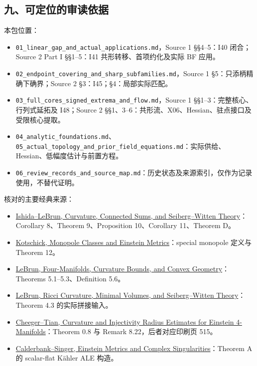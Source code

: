 \documentclass[
  10pt,
]{article}
\providecommand{\tightlist}{%
  \setlength{\itemsep}{0pt}\setlength{\parskip}{0pt}}
\begin{document}
\hypertarget{ux4e5dux53efux5b9aux4f4dux7684ux5ba1ux8bfbux4f9dux636e}{%
\subsection{九、可定位的审读依据}\label{ux4e5dux53efux5b9aux4f4dux7684ux5ba1ux8bfbux4f9dux636e}}

本包位置：

\begin{itemize}
\tightlist
\item
  \nolinkurl{01_linear_gap_and_actual_applications.md}，Source 1
  §§4--5：I40 闭合；Source 2 Part I §§1--5：I41 共形转移、首项约化及实际
  BF 应用。
\item
  \nolinkurl{02_endpoint_covering_and_sharp_subfamilies.md}，Source 1
  §5：只添柄精确下确界；Source 2 §3：I45；§4：局部实际匹配。
\item
  \nolinkurl{03_full_cores_signed_extrema_and_flow.md}，Source 1
  §§1--3：完整核心、行列式延拓及 I48；Source 2
  §§1、3--6：共形流、X06、Hessian、驻点接口及受限核心提取。
\item
  \nolinkurl{04_analytic_foundations.md}、\nolinkurl{05_actual_topology_and_prior_field_equations.md}：实际供给、Hessian、低幅度估计与前置方程。
\item
  \nolinkurl{06_review_records_and_source_map.md}：历史状态及来源索引，仅作为记录使用，不替代证明。
\end{itemize}

核对的主要经典来源：

\begin{itemize}
\tightlist
\item
  \href{https://arxiv.org/pdf/math/0111228}{Ishida--LeBrun, Curvature,
  Connected Sums, and Seiberg--Witten Theory}：Corollary 8、Theorem
  9、Proposition 10、Corollary 11、Theorem D。
\item
  \href{https://arxiv.org/pdf/math/0306022}{Kotschick, Monopole Classes
  and Einstein Metrics}：special monopole 定义与 Theorem 12。
\item
  \href{https://arxiv.org/pdf/math/0611450}{LeBrun, Four-Manifolds,
  Curvature Bounds, and Convex Geometry}：Theorems 5.1--5.3、Definition
  5.6。
\item
  \href{https://arxiv.org/pdf/math/0003068}{LeBrun, Ricci Curvature,
  Minimal Volumes, and Seiberg--Witten Theory}：Theorem 4.3
  的实际拼接输入。
\item
  \href{https://scispace.com/pdf/curvature-and-injectivity-radius-estimates-for-einstein-4-2a7sb1l653.pdf}{Cheeger--Tian,
  Curvature and Injectivity Radius Estimates for Einstein
  4-Manifolds}：Theorem 0.8 与 Remark 8.22，后者对应印刷页 515。
\item
  \href{https://arxiv.org/pdf/math/0206229}{Calderbank--Singer, Einstein
  Metrics and Complex Singularities}：Theorem A 的 scalar-flat Kähler
  ALE 构造。
\end{itemize}
\end{document}
